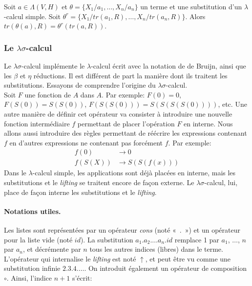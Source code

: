 \begin{prop}
Soit $a \in \Lambda(V,H)$ et $\theta = \{ X_1/a_1, \dots, X_n / a_n \}$ un terme et une substitution d’un $\lambda$-calcul simple. Soit $\theta^{r} = \{ X_1 / tr(a_1,R), \dots, X_n / tr(a_n,R) \}$. Alors $tr(\theta (a),R) = \theta^{r}(tr(a,R))$.
\end{prop}

\subsubsection{Le $\lambda \sigma$-calcul}

Le $\lambda \sigma$-calcul implémente le $\lambda$-calcul écrit avec la notation de de Bruijn, ainsi que les $\beta$ et $\eta$ réductions. Il est différent de part la manière dont ils traitent les substitutions. Essayons de comprendre l’origine du $\lambda \sigma$-calcul. \\

Soit $F$ une fonction de $A$ dans $A$. Par exemple: $F(0)=0$, $F(S(0))=S(S(0))$, $F(S(S(0)))=S(S(S(S(0))))$, etc. Une autre manière de définir cet opérateur va consister à introduire une nouvelle fonction intermédiaire $f$ permettant de placer l’opération $F$ en interne. Nous allons aussi introduire des règles permettant de réécrire les expressions contenant $f$ en d’autres expressions ne contenant pas forcément $f$. Par exemple:
\begin{align*}
f(0) &\xrightarrow{}{0} \\
f(S(X)) &\xrightarrow{}{S(S(f(x)))}
\end{align*}
Dans le $\lambda$-calcul simple, les applications sont déjà placées en interne, mais les substitutions et le \textit{lifting} se traitent encore de façon externe. Le $\lambda \sigma$-calcul, lui, place de façon interne les substitutions et le \textit{lifting}.\\

\paragraph{Notations utiles.} Les listes sont représentées par un opérateur \textit{cons} (noté « . ») et un opérateur pour la liste vide (noté $id$). La substitution $a_1.a_2. \dots a_n . id$ remplace 1 par $a_1$, $\dots$, $n$ par $a_n$, et décrémente par $n$ tous les autres indices (libres) dans le terme. L’opérateur qui internalise le \textit{lifting} est noté $\uparrow$, et peut être vu comme une substitution infinie $2.3.4.\dots$. On introduit également un opérateur de composition $\circ$. Ainsi, l'indice $n+1$ s'écrit:

